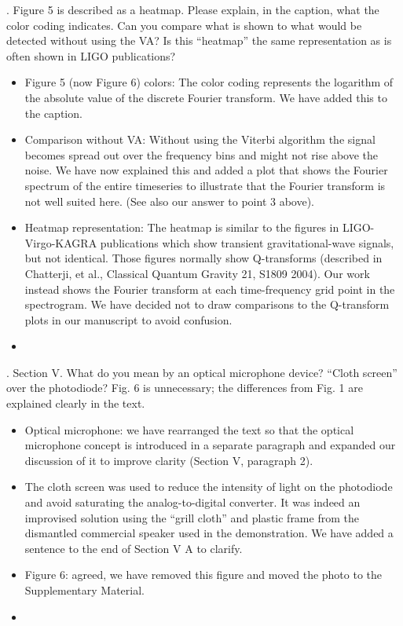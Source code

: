 \documentclass{article}
\newcommand{\han}{\textcolor{orange}}
\begin{document}
. Figure 5 is described as a heatmap.  Please explain, in the caption, what the color coding indicates.  Can you compare what is shown to what would be detected without using the VA?  Is this ``heatmap'' the same representation as is often shown in LIGO publications?
\begin{itemize}
\item Figure 5 (now Figure 6) colors: The color coding represents the logarithm of the absolute value of the discrete Fourier transform. We have added this to the caption.
\item Comparison without VA: Without using the Viterbi algorithm the signal becomes spread out over the frequency bins and might not rise above the noise. We have now explained this and added a plot that shows the Fourier spectrum of the entire timeseries to illustrate that the Fourier transform is not well suited here. (See also our answer to point 3 above).
\item Heatmap representation: The heatmap is similar to the figures in LIGO-Virgo-KAGRA publications which show transient gravitational-wave signals, but not identical. Those figures normally show Q-transforms (described in Chatterji, et al., Classical Quantum Gravity 21, S1809 2004). Our work instead shows the Fourier transform at each time-frequency grid point in the spectrogram. We have decided not to draw comparisons to the Q-transform plots in our manuscript to avoid confusion.
\item[]
\end{itemize}


. Section V.  What do you mean by an optical microphone device?  “Cloth screen” over the photodiode?  Fig. 6 is unnecessary; the differences from Fig. 1 are explained clearly in the text.
\begin{itemize}
\item Optical microphone: we have rearranged the text so that the optical microphone concept is introduced in a separate paragraph and expanded our discussion of it to improve clarity (Section V, paragraph 2).
\item The cloth screen was used to reduce the intensity of light on the photodiode and avoid saturating the analog-to-digital converter. It was indeed an improvised solution using the ``grill cloth'' and plastic frame from the dismantled commercial speaker used in the demonstration. We have added a sentence to the end of Section V A to clarify. %
\item Figure 6: agreed, we have removed this figure and moved the photo to the Supplementary Material.
\item []
\end{itemize}  
\end{document}
